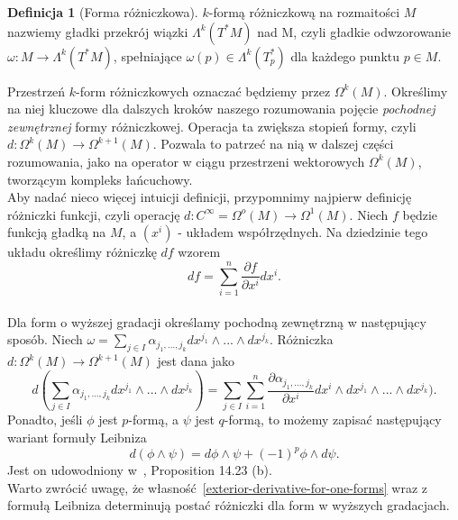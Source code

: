 \documentclass[licencjacka]{pracamgr}
\theoremstyle{definition}
\newtheorem{definition}{Definicja}[section]
\theoremstyle{definition}
\theoremstyle{plain}
\theoremstyle{plain}
\theoremstyle{plain}
\theoremstyle{plain}
\begin{document}
\begin{definition}[Forma różniczkowa]
  $k$-formą różniczkową na rozmaitości $M$ nazwiemy gładki przekrój wiązki
  $\Lambda^k(T^\ast M)$ nad M, czyli gładkie odwzorowanie $\omega: M \rightarrow
  \Lambda^k (T^\ast M)$, spełniające $\omega(p) \in \Lambda^k(T_p^\ast)$ dla
  każdego punktu $p \in M$.
\end{definition}

Przestrzeń $k$-form różniczkowych oznaczać będziemy przez $\Omega^k(M)$. 
Określimy na niej kluczowe dla dalszych kroków naszego rozumowania pojęcie
\emph{pochodnej zewnętrznej} formy różniczkowej. Operacja ta zwiększa stopień
formy, czyli $d: \Omega^k(M) \rightarrow \Omega^{k+1} (M)$. Pozwala to patrzeć
na nią w dalszej części rozumowania, jako na operator w ciągu przestrzeni
wektorowych $\Omega^k(M)$, tworzącym kompleks łańcuchowy. \\


Aby nadać nieco więcej intuicji definicji, przypomnimy najpierw
definicję różniczki funkcji, czyli operację 
$d: C^\infty = \Omega^o(M) \rightarrow \Omega^1(M)$. Niech $f$ będzie funkcją
gładką na $M$, a $(x^i)$ -  układem współrzędnych. Na dziedzinie tego układu
określimy różniczkę $df$ wzorem
\begin{equation}\label{exterior-derivative-for-one-forms}
df = \sum_{i=1}^n \frac{\partial f}{\partial x^i} dx^i.
\end{equation} \\

Dla form o wyższej gradacji określamy pochodną zewnętrzną w następujący
sposób. Niech 
$\omega = \sum_{j \in I} \alpha_{j_1, ..., j_k} dx^{j_1} \wedge ... \wedge dx^{j_k}$.
Różniczka $d: \Omega^k(M) \rightarrow \Omega^{k+1}(M)$ jest dana jako
\[ %
d( \sum_{j \in I} \alpha_{j_1, ..., j_k} dx^{j_1} \wedge ... \wedge dx^{j_k}) = 
 \sum_{j \in I} \sum_{i=1}^n
 \frac{ \partial \alpha_{j_1, ..., j_k}} {\partial x^i} dx^i
                            \wedge dx^{j_1} \wedge ... \wedge dx^{j_k}).
\]
Ponadto, jeśli $\phi$ jest $p$-formą, a $\psi$ jest $q$-formą, to możemy
zapisać następujący wariant formuły Leibniza
\[
d(\phi \wedge \psi) = d\phi \wedge \psi + (-1)^p \phi \wedge d\psi.
\]
Jest on udowodniony w~\cite{lee}, Proposition 14.23 (b). \\

Warto zwrócić uwagę, że własność~\ref{exterior-derivative-for-one-forms} wraz z
formułą Leibniza determinują postać różniczki dla form w wyższych gradacjach. \\
\end{document}
